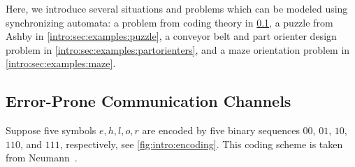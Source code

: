 
Here,  we introduce several situations and problems
which can be modeled using synchronizing automata:
a problem from coding theory in \cref{intro:sec:examples:communication},
a puzzle from Ashby in \cref{intro:sec:examples:puzzle},
a conveyor belt and part orienter design problem in \cref{intro:sec:examples:partorienters},
and a maze orientation problem in \cref{intro:sec:examples:maze}.

\subsection{Error-Prone Communication Channels}
\label{intro:sec:examples:communication}

Suppose five symbols $e,h,l,o,r$ are encoded by five binary sequences $00$, $01$, $10$, $110$,
and $111$, respectively, see \cref{fig:intro:encoding}. This coding scheme is taken from Neumann~\cite{neumann71}. 

